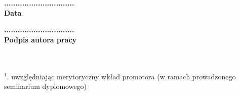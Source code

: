 \documentclass[twoside,a4paper,12pt]{extreport} %
\begin{document}
\begin{minipage}{0.4\textwidth}
\begin{flushleft}
\centering
\textbf{...............................}\\
\textbf{Data}
\end{flushleft}
\end{minipage}
\begin{minipage}{0.4\textwidth}
\begin{flushright}
\textbf{...............................}\\
\textbf{Podpis autora pracy}
\end{flushright}
\end{minipage}\\\\

$^1$. uwzględniając merytoryczny wkład promotora (w ramach prowadzonego seminarium dyplomowego)

\tableofcontents
\newpage

\fancyhead[LE,RO]{\slshape \rightmark}
\fancyhead[LO,RE]{\slshape \leftmark}
\fancyfoot[C]{\thepage}

\setlength{\parskip}{1ex} %
\onehalfspacing













         {\protect{}}
\end{document}
